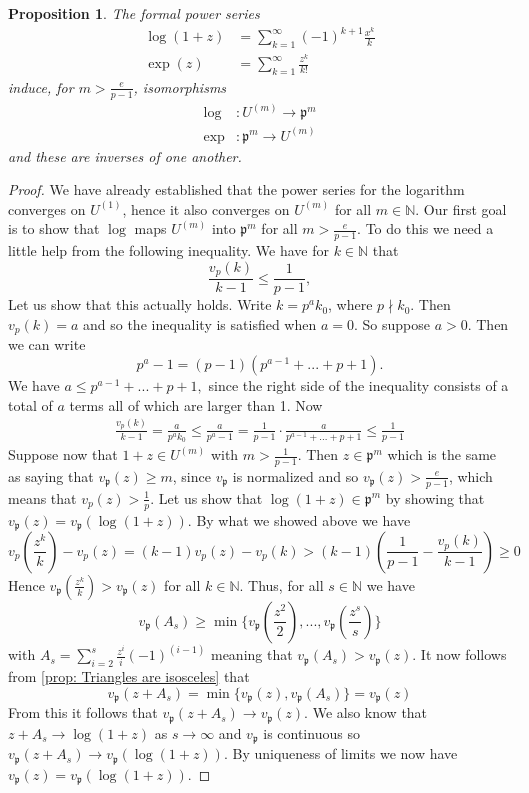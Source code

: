 \documentclass{article}
\newtheorem{proposition}{Proposition}[section]
\newcommand{\mfrak}[1]{\mathfrak{#1}}
\newcommand{\mbb}[1]{\mathbb{#1}}
\newcommand{\vp}{{v_{\mfrak p}}}
\begin{document}
\begin{proposition}\label{prop: Log and exp for local fields}
    The formal power series 
    \begin{align*}
        \log(1+z) &= \sum_{k = 1}^\infty (-1)^{k+1}\frac{x^k}{k} \\
        \exp(z) &= \sum_{k = 1}^\infty \frac{z^k}{k!} 
    \end{align*}
    induce, for $m > \frac{e}{p-1}$, isomorphisms
    \begin{align*}
        \log &: U^{(m)} \to \mfrak p^m \\ 
        \exp &: \mfrak p^m \to U^{(m)}
    \end{align*}
    and these are inverses of one another.
\end{proposition}

\begin{proof}
    We have already established that the power series for the logarithm converges on $U^{(1)}$, hence it also converges on $U^{(m)}$ for all $m \in \mbb N$. Our first goal is to show that $\log$ maps $U^{(m)}$ into $\mfrak p^{m}$ for all $m > \frac{e}{p-1}$. To do this we need a little help from the following inequality. We have for $k \in \mbb N$ that
    $$\frac{v_p(k)}{k-1} \leq \frac{1}{p-1},$$
    Let us show that this actually holds. Write $k = p^ak_0$, where $p \nmid k_0$. Then $v_p(k) = a$ and so the inequality is satisfied when $a = 0$. So suppose $a > 0$. Then we can write 
    $$p^a - 1 = (p-1)(p^{a-1} + ... + p + 1).$$
    We have
    $a \leq p^{a-1} + ... + p + 1,$
    since the right side of the inequality consists of a total of $a$ terms all of which are larger than 1. Now
    \begin{align*}
        \frac{v_p(k)}{k-1} = \frac{a}{p^ak_0} \leq \frac{a}{p^a - 1} = \frac{1}{p-1}\cdot \frac{a}{p^{a-1} + ... + p + 1} \leq \frac{1}{p-1}
    \end{align*}  
    Suppose now that $1+z \in U^{(m)}$ with $ m > \frac{1}{p-1}$. Then $z \in \mfrak p^m$ which is the same as saying that $\vp (z) \geq m$, since $\vp$ is normalized and so $\vp(z) > \frac{e}{p-1}$, which means that $v_p(z) > \frac{1}{p}$. Let us show that $\log(1+z) \in \mfrak p^m$ by showing that $\vp(z) = \vp(\log(1+ z))$. By what we showed above we have
    $$v_p(\frac{z^k}{k}) - v_p(z) = (k-1)v_p(z) - v_p(k) > (k-1)(\frac{1}{p-1} - \frac{v_p(k)}{k-1}) \geq 0$$  
    Hence $\vp(\frac{z^k}{k}) > \vp(z)$ for all $k \in \mbb N$. Thus, for all $s \in \mbb N$ we have $$\vp(A_s) \geq \min \{\vp(\frac{z^2}{2}), ..., \vp(\frac{z^s}{s}) \}$$ 
    with $A_s = \sum_{i = 2}^s \frac{z^i}{i} (-1)^{(i-1)}$ meaning that $\vp(A_s) > \vp(z)$. It now follows from \cref{prop: Triangles are isosceles} that 
    $$\vp(z + A_s) = \min\{\vp(z), \vp(A_s)\} = \vp(z)$$
    From this it follows that $\vp(z + A_s) \to \vp(z)$. We also know that $z + A_s \to \log(1 + z)$ as $s \to \infty$ and $\vp$ is continuous so $\vp(z + A_s) \to \vp(\log(1 + z))$. By uniqueness of limits we now have $\vp(z) = \vp(\log(1+z))$. 
    

\end{proof}
\end{document}
